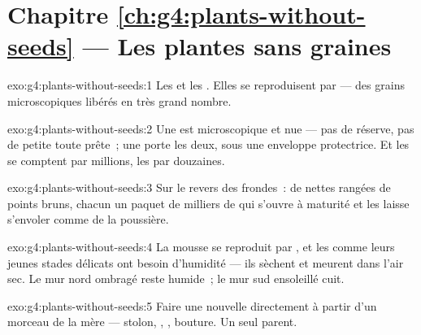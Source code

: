 \section*{Chapitre \ref{ch:g4:plants-without-seeds} --- Les plantes sans graines}

\begin{solution}{exo:g4:plants-without-seeds:1}
Les  et les . Elles se reproduisent par  ---
des grains microscopiques libérés en très grand nombre.
\end{solution}

\begin{solution}{exo:g4:plants-without-seeds:2}
Une  est microscopique et nue --- pas de réserve, pas de petite
 toute prête~; une  porte les deux, sous une enveloppe
protectrice. Et les  se comptent par millions, les  par
douzaines.
\end{solution}

\begin{solution}{exo:g4:plants-without-seeds:3}
Sur le revers des frondes~: de nettes rangées de points bruns,
chacun un paquet de milliers de  qui s'ouvre à maturité et les
laisse s'envoler comme de la poussière.
\end{solution}

\begin{solution}{exo:g4:plants-without-seeds:4}
La mousse se reproduit par , et les  comme leurs jeunes
stades délicats ont besoin d'humidité --- ils sèchent et meurent
dans l'air sec. Le mur nord ombragé reste humide~; le mur sud
ensoleillé cuit.
\end{solution}

\begin{solution}{exo:g4:plants-without-seeds:5}
Faire une nouvelle  directement à partir d'un morceau de la
 mère --- stolon, , , bouture. Un seul parent.
\end{solution}


